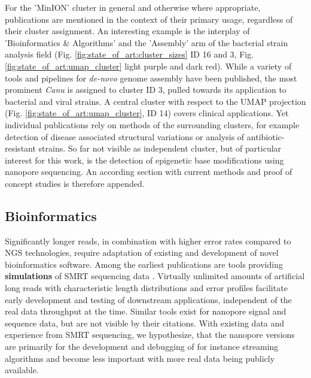 For the 'MinION' cluster in general and otherwise where appropriate, publications are mentioned in the context of their primary usage, regardless of their cluster assignment.
An interesting example is the interplay of 'Bioinformatics \& Algorithms' and the 'Assembly' arm of the bacterial strain analysis field (Fig. \ref{fig:state_of_art:cluster_sizes} ID 16 and 3, Fig. \ref{fig:state_of_art:umap_cluster} light purple and dark red).
While a variety of tools and pipelines for \textit{de-novo} genome assembly have been published, the most prominent \textit{Canu} \cite{Koren2017} is assigned to cluster ID 3, pulled towards its application to bacterial and viral strains.
A central cluster with respect to the UMAP projection (Fig. \ref{fig:state_of_art:umap_cluster}, ID 14) covers clinical applications. Yet individual publications rely on methods of the surrounding clusters, for example detection of disease associated structural variations or analysis of antibiotic-resistant strains.
So far not visible as independent cluster, but of particular interest for this work, is the detection of epigenetic base modifications using nanopore sequencing.
An according section with current methods and proof of concept studies is therefore appended.




\subsection{Bioinformatics}
\label{subsec:state_of_art:bioinf}

Significantly longer reads, in combination with higher error rates compared to NGS technologies, require adaptation of existing and development of novel bioinformatics software.
Among the earliest publications are tools providing \textbf{simulations} of SMRT sequencing data \cite{Ono2013, Stoecker2016}.
Virtually unlimited amounts of artificial long reads with characteristic length distributions and error profiles facilitate early development and testing of downstream applications, independent of the real data throughput at the time.
Similar tools exist for nanopore signal and sequence data, but are not visible by their citations.
With existing data and experience from SMRT sequencing, we hypothesize, that the nanopore versions are primarily for the development and debugging of for instance streaming algorithms and become less important with more real data being publicly available.

